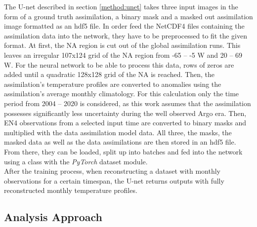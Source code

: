 \documentclass[Masterarbeit.tex]{subfile}
\begin{document}
	The U-net described in section \ref{method:unet} takes three input images in the form of a ground truth assimilation, a binary mask and a masked out assimilation image formatted as an hdf5 file. In order feed the NetCDF4 files containing the assimilation data into the network, they have to be preprocessed to fit the given format. At first, the NA region is cut out of the global assimilation runs. This leaves an irregular 107x124 grid of the NA region from -65 -- -5 \dg W and 20 -- 69 \dg W. For the neural network to be able to process this data, rows of zeros are added until a quadratic 128x128 grid of the NA is reached. Then, the assimilation's temperature profiles are converted to anomalies using the assimilation's average monthly climatology. For this calculation only the time period from 2004 -- 2020 is considered, as this work assumes that the assimilation possesses significantly less uncertainty during the well observed Argo era. Then, EN4 observations from a selected input time are converted to binary masks and multiplied with the data assimilation model data. All three, the masks, the masked data as well as the data assimilations are then stored in an hdf5 file. From there, they can be loaded, split up into batches and fed into the network using a class with the \textit{PyTorch} dataset module.\\
	After the training process, when reconstructing a dataset with monthly observations for a certain timespan, the U-net returns outputs with fully reconstructed monthly temperature profiles.
	
	\subsection{Analysis Approach}
	
\end{document}
